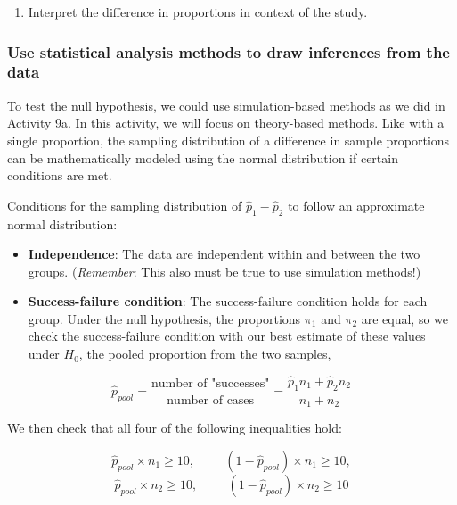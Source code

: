 \documentclass[
]{report}
\providecommand{\tightlist}{%
  \setlength{\itemsep}{0pt}\setlength{\parskip}{0pt}}
\begin{document}
\vspace{0.5in}

\begin{enumerate}
\def\labelenumi{\arabic{enumi}.}
\setcounter{enumi}{4}
\tightlist
\item
  Interpret the difference in proportions in context of the study.
  \vspace{0.8in}
\end{enumerate}

\hypertarget{use-statistical-analysis-methods-to-draw-inferences-from-the-data-3}{%
\subsubsection*{Use statistical analysis methods to draw inferences from the data}\label{use-statistical-analysis-methods-to-draw-inferences-from-the-data-3}}

To test the null hypothesis, we could use simulation-based methods as we did in Activity 9a. In this activity, we will focus on theory-based methods. Like with a single proportion, the sampling distribution of a difference in sample proportions can be mathematically modeled using the normal distribution if certain conditions are met.

Conditions for the sampling distribution of \(\hat{p}_1-\hat{p}_2\) to follow an approximate normal distribution:

\begin{itemize}
\item
  \textbf{Independence}: The data are independent within and between the two groups. (\emph{Remember}: This also must be true to use simulation methods!)
\item
  \textbf{Success-failure condition}: The success-failure condition holds for each group. Under the null hypothesis, the proportions \(\pi_1\) and \(\pi_2\) are equal, so we check the success-failure condition with our best estimate of these values under \(H_0\), the pooled proportion from the two samples,
\end{itemize}

\[
\hat{p}_{pool} = \frac{\text{number of "successes"}}{\text{number of cases}} = \frac{\hat{p}_1 n_1+\hat{p}_2 n_2}{n_1+n_2}
\]
\newpage

We then check that all four of the following inequalities hold:

\[\hat{p}_{pool} \times n_1 \ge 10, \hspace{1cm} (1 - \hat{p}_{pool}) \times n_1 \geq 10,\]
\[\hat{p}_{pool} \times n_2 \ge 10, \hspace{1cm} (1 - \hat{p}_{pool}) \times n_2 \geq 10\]
\end{document}
